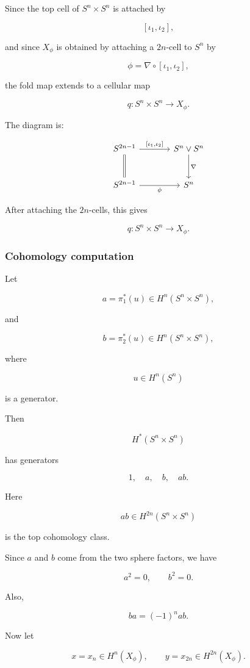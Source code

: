 \documentclass[12pt,a4paper]{article}
\theoremstyle{notespace}
\begin{document}
Since the top cell of \(S^n\times S^n\) is attached by

\[
[\iota_1,\iota_2],
\]

and since \(X_\phi\) is obtained by attaching a \(2n\)-cell to \(S^n\) by

\[
\phi=\nabla\circ[\iota_1,\iota_2],
\]

the fold map extends to a cellular map

\[
q:S^n\times S^n\longrightarrow X_\phi.
\]

The diagram is:

\[
\begin{tikzcd}[column sep=large,row sep=large]
	S^{2n-1}
	\arrow[r,"{[\iota_1,\iota_2]}"]
	\arrow[d,equal]
	&
	S^n\vee S^n
	\arrow[d,"\nabla"]
	\\
	S^{2n-1}
	\arrow[r,"\phi"']
	&
	S^n
\end{tikzcd}
\]

After attaching the \(2n\)-cells, this gives

\[
q:S^n\times S^n\to X_\phi.
\]

\subsubsection*{Cohomology computation}

Let

\[
a=\pi_1^*(u)\in H^n(S^n\times S^n),
\]

and

\[
b=\pi_2^*(u)\in H^n(S^n\times S^n),
\]

where

\[
u\in H^n(S^n)
\]

is a generator.

Then

\[
H^*(S^n\times S^n)
\]

has generators

\[
1,\quad a,\quad b,\quad ab.
\]

Here

\[
ab\in H^{2n}(S^n\times S^n)
\]

is the top cohomology class.

Since \(a\) and \(b\) come from the two sphere factors, we have

\[
a^2=0,
\qquad
b^2=0.
\]

Also,

\[
ba=(-1)^n ab.
\]

Now let

\[
x=x_n\in H^n(X_\phi),
\qquad
y=x_{2n}\in H^{2n}(X_\phi).
\]
\end{document}
